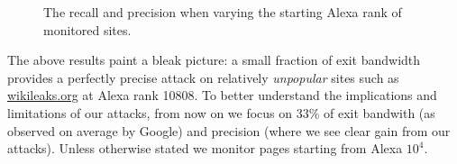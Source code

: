 \begin{figure}[t]
\centering
{}
\caption{The recall and precision when varying the starting Alexa rank of
monitored sites.}
\label{fig:wfdns:alexa}
\end{figure}

The above results paint a bleak picture: a small fraction of exit
bandwidth provides a perfectly precise attack on relatively
\emph{unpopular} sites such as \url{wikileaks.org} at Alexa rank 10808.
To better understand the implications and limitations of our attacks,
from now on we focus on
33\% of exit bandwith (as observed on average by Google) and
precision (where we see clear gain from our attacks). Unless otherwise stated
we monitor pages starting from Alexa $10^4$.

